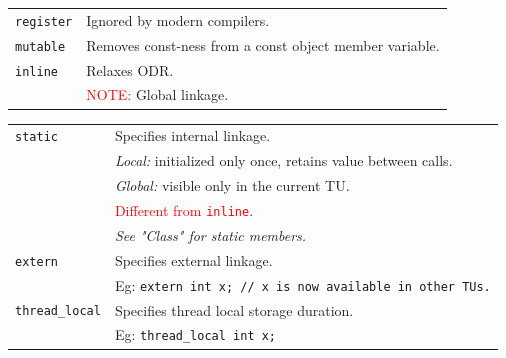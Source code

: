 \begin{tabularx}{\linewidth}{lX}
    \hline
    \texttt{register}       & Ignored by modern compilers.\\ 
    \texttt{mutable}        & Removes const-ness from a const object member variable.\\
    \texttt{inline}         & Relaxes ODR.\\
                            & \textcolor{red}{NOTE:} Global linkage.\\
    \hline
\end{tabularx}

\begin{tabularx}{\linewidth}{lX}
    \texttt{static}         & Specifies internal linkage.\\
                            & \textit{Local:} initialized only once, retains value between calls.\\
                            & \textit{Global:} visible only in the current TU.\\
                            & \textcolor{red}{Different from \texttt{inline}}.\\
                            & \textit{See "Class" for static members.}\\
    \texttt{extern}         & Specifies external linkage.\\
                            & Eg: \texttt{extern int x; // x is now available in other TUs.}\\
    \texttt{thread\_local}  & Specifies thread local storage duration.\\
                            & Eg: \texttt{thread\_local int x;}\\
    \hline
\end{tabularx}

\vfill\null
\columnbreak

